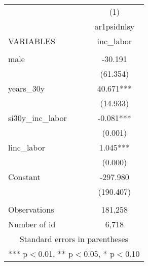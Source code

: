 \begin{tabular}{lc} \hline
 & (1) \\
 & ar1psidnlsy \\
VARIABLES & inc\_labor \\ \hline
 &  \\
male & -30.191 \\
 & (61.354) \\
years\_30y & 40.671*** \\
 & (14.933) \\
si30y\_inc\_labor & -0.081*** \\
 & (0.001) \\
linc\_labor & 1.045*** \\
 & (0.000) \\
Constant & -297.980 \\
 & (190.407) \\
 &  \\
Observations & 181,258 \\
 Number of id & 6,718 \\ \hline
\multicolumn{2}{c}{ Standard errors in parentheses} \\
\multicolumn{2}{c}{ *** p$<$0.01, ** p$<$0.05, * p$<$0.10} \\
\end{tabular}

